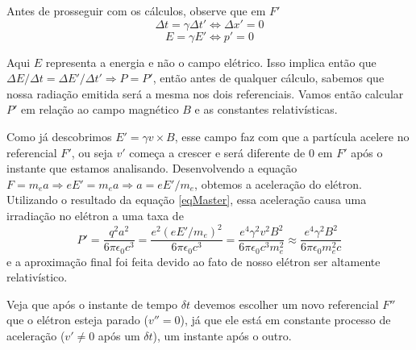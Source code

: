 \documentclass[12pt, letterpaper]{article}
\begin{document}
    Antes de prosseguir com os cálculos, observe que em $F'$
    $$
    \Delta t = \gamma\Delta t' \iff \Delta x' = 0
    $$$$
    E = \gamma E' \iff p' = 0
    $$

    Aqui $E$ representa a energia e não o campo elétrico. Isso implica então que $\Delta E/\Delta t = \Delta E'/\Delta t' \Longrightarrow P = P'$, então antes de qualquer cálculo, sabemos que nossa radiação emitida será a mesma nos dois referenciais. Vamos então calcular $P'$ em relação ao campo magnético $B$ e as constantes relativísticas.

    Como já descobrimos $E' = \gamma v\times B$, esse campo faz com que a partícula acelere no referencial $F'$, ou seja $v'$ começa a crescer e será diferente de 0 em $F'$ após o instante que estamos analisando. Desenvolvendo a equação $F = m_ea \Rightarrow eE' = m_ea \Rightarrow a = eE'/m_e$, obtemos a aceleração do elétron. Utilizando o resultado da equação \ref{eqMaster}, essa aceleração causa uma irradiação no elétron a uma taxa de
    \begin{equation} \label{eq13}
        P' = \frac{q^2a^2}{6\pi\epsilon_0c^3} = \frac{e^2(eE'/m_e)^2}{6\pi\epsilon_0c^3} = \frac{e^4\gamma^2v^2B^2}{6\pi\epsilon_0c^3m_e^2} \approx \frac{e^4\gamma^2B^2}{6\pi\epsilon_0m_e^2c}
    \end{equation}
    e a aproximação final foi feita devido ao fato de nosso elétron ser altamente relativístico.

    Veja que após o instante de tempo $\delta t$ devemos escolher um novo referencial $F''$ que o elétron esteja parado ($v'' = 0$), já que ele está em constante processo de aceleração ($v' \neq 0$ após um $\delta t$), um instante após o outro.
\end{document}

